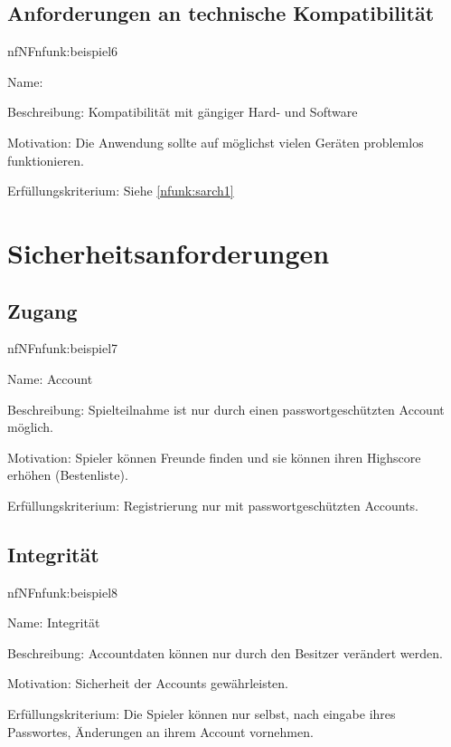 \subsection{Anforderungen an technische Kompatibilität}

\begin{description}[leftmargin=5em, style=sameline]	
	\begin{lhp}{nf}{NF}{nfunk:beispiel6}
		\item [Name:] 
		\item [Beschreibung:] Kompatibilität mit gängiger Hard- und Software
		\item [Motivation:] Die Anwendung sollte auf möglichst vielen Geräten problemlos funktionieren.
		\item [Erfüllungskriterium:] Siehe \ref{nfunk:sarch1}
	\end{lhp}
\end{description}

\section{Sicherheitsanforderungen}

\subsection{Zugang}

\begin{description}[leftmargin=5em, style=sameline]	
	\begin{lhp}{nf}{NF}{nfunk:beispiel7}
		\item [Name:] Account
		\item [Beschreibung:] Spielteilnahme ist nur durch einen passwortgeschützten Account möglich.
		\item [Motivation:] Spieler können Freunde finden und sie können ihren Highscore erhöhen (Bestenliste).
		\item [Erfüllungskriterium:] Registrierung nur mit passwortgeschützten Accounts.
	\end{lhp}
\end{description}

\subsection{Integrität}

\begin{description}[leftmargin=5em, style=sameline]	
	\begin{lhp}{nf}{NF}{nfunk:beispiel8}
		\item [Name:] Integrität
		\item [Beschreibung:] Accountdaten können nur durch den Besitzer verändert werden.
		\item [Motivation:] Sicherheit der Accounts gewährleisten.
		\item [Erfüllungskriterium:] Die Spieler können nur selbst, nach eingabe ihres Passwortes, Änderungen an ihrem Account vornehmen.
	\end{lhp}
\end{description}

